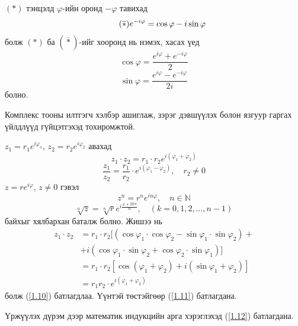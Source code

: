$(*)$ тэнцэлд $\varphi$-ийн оронд $-\varphi$ тавихад
\begin{equation}
\tag{$\overline{*}$}
e^{-i\varphi}=\cos\varphi -i\sin\varphi 
\end{equation}
болж $(*)$ ба $(\overline{*})$-ийг хооронд нь нэмэх, хасах үед 
\begin{equation} 
\cos\varphi =\dfrac{e^{i\varphi}+e^{-i\varphi}}{2}
\end{equation}
\begin{equation}
\sin\varphi =\dfrac{e^{i\varphi}-e^{-i\varphi}}{2i}
\end{equation}
болно.

Комплекс тооны илтгэгч хэлбэр ашиглаж, зэрэг  дэвшүүлэх болон язгуур  гаргах үйлдлүүд гүйцэтгэхэд тохиромжтой.

$z_1=r_1e^{i\varphi_1}$, $z_2=r_2e^{i\varphi_2}$ авахад
\begin{equation} \label{1.10}
z_1\cdot z_2=r_1\cdot r_2 e^{i(\varphi_1+\varphi_2)}
\end{equation}
\begin{equation} \label{1.11}
\dfrac{z_1}{z_2}=\dfrac{r_1}{r_2}\cdot e^{i(\varphi_1-\varphi_2)}, \quad r_2\neq 0
\end{equation} $z=re^{i\varphi}$, $z\neq 0$ гэвэл 
\begin{equation} \label{1.12}
z^n=r^ne^{in\varphi}, \quad n\in\mathbb{N}
\end{equation}
\begin{equation} \label{1.13}
\sqrt[n]{z}=\sqrt[n]{r}e^{i\frac{\varphi+2k\pi}{n}}, \quad (k=0,1,2,\ldots, n-1)
\end{equation}
байхыг хялбархан баталж болно. Жишээ нь 
\begin{align*}
    z_1\cdot z_2&=r_1\cdot r_2[(\cos \varphi_1\cdot \cos \varphi_2-\sin \varphi_1\cdot \sin\varphi_2)+ \\ &+i(\cos \varphi_1\cdot\sin \varphi_2+\cos \varphi_2\cdot \sin\varphi_1)] \\
    &= r_1\cdot r_2 [\cos (\varphi_1+\varphi_2)+i(\sin \varphi_1+\varphi_2)]\\
    &=r_1r_2\cdot e^{i(\varphi_1+\varphi_2)}
\end{align*}
болж (\ref{1.10}) батлагдлаа. Үүнтэй төстэйгөөр (\ref{1.11}) батлагдана.

Үржүүлэх дүрэм дээр математик индукцийн арга хэрэглэхэд (\ref{1.12}) батлагдана.

